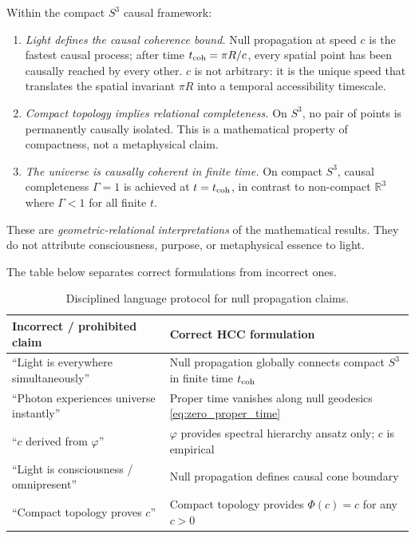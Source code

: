 \documentclass[12pt,a4paper]{article}
\theoremstyle{plain}
\theoremstyle{definition}
\theoremstyle{remark}
\begin{document}
\begin{tcolorbox}[philobox={Philosophical Synthesis}]
Within the compact $S^3$ causal framework:
\begin{enumerate}[label=(\arabic*),leftmargin=1.4em]
  \item \textit{Light defines the causal coherence bound.}
    Null propagation at speed $c$ is the fastest causal process;
    after time $t_{\rm coh} = \pi R/c$, every spatial point has been
    causally reached by every other.
    $c$ is not arbitrary: it is the unique speed that translates the
    spatial invariant $\pi R$ into a temporal accessibility timescale.
  \item \textit{Compact topology implies relational completeness.}
    On $S^3$, no pair of points is permanently causally isolated.
    This is a mathematical property of compactness, not a metaphysical claim.
  \item \textit{The universe is causally coherent in finite time.}
    On compact $S^3$, causal completeness $\Gamma = 1$ is achieved
    at $t = t_{\rm coh}$, in contrast to non-compact $\mathbb{R}^3$
    where $\Gamma < 1$ for all finite $t$.
\end{enumerate}
These are \emph{geometric-relational interpretations} of the mathematical results.
They do not attribute consciousness, purpose, or metaphysical essence to light.
\end{tcolorbox}

The table below separates correct formulations from incorrect ones.

\begin{table}[h!]
\centering\renewcommand{\arraystretch}{1.3}
\begin{tabularx}{\textwidth}{XX}
\toprule
\textbf{Incorrect / prohibited claim} & \textbf{Correct HCC formulation}\\
\midrule
\rowcolor{rowA}
``Light is everywhere simultaneously'' &
  Null propagation globally connects compact $S^3$ in finite time $t_{\rm coh}$\\
``Photon experiences universe instantly'' &
  Proper time vanishes along null geodesics \eqref{eq:zero_proper_time}\\
\rowcolor{rowA}
``$c$ derived from $\varphi$'' &
  $\varphi$ provides spectral hierarchy ansatz only; $c$ is empirical\\
``Light is consciousness / omnipresent'' &
  Null propagation defines causal cone boundary\\
\rowcolor{rowA}
``Compact topology proves $c$'' &
  Compact topology provides $\Phi(c)=c$ for any $c>0$\\
\bottomrule
\end{tabularx}
\caption{Disciplined language protocol for null propagation claims.}
\label{tab:language}
\end{table}
\end{document}

